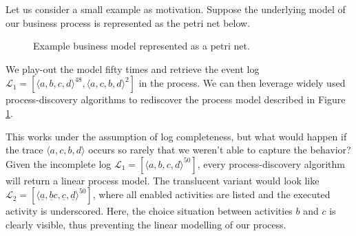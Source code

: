Let us consider a small example as motivation. Suppose the underlying model of our business process is represented as the petri net below.

\begin{figure}[h]
    \centering
\caption{Example business model represented as a petri net.}
\label{petrinet}

\end{figure}

We play-out the model fifty times and retrieve the event log $\mathcal{L}_1 = [ \langle a, b, c, d \rangle ^{48}, \langle a, c, b, d \rangle^2 ]$ in the process. We can then leverage widely used process-discovery algorithms to rediscover the process model described in Figure \ref{petrinet}. 

This works under the assumption of log completeness, but what would happen if the trace $\langle a, c, b, d \rangle$ occurs so rarely that we weren't able to capture the behavior? Given the incomplete log $\mathcal{L}_1 = [ \langle a, b, c, d \rangle ^{50}]$, every process-discovery algorithm will return a linear process model. The translucent variant would look like $\mathcal{L}_2 = [ \langle \underline{a}, \underline{b}c,  \underline{c},  \underline{d} \rangle ^{50}]$, where all enabled activities are listed and the executed activity is underscored. Here, the choice situation between activities $b$ and $c$ is clearly visible, thus preventing the linear modelling of our process.

